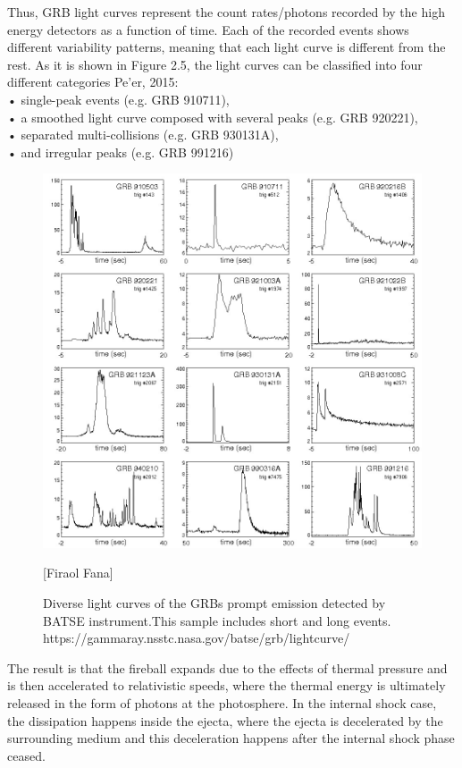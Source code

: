 Thus, GRB light curves represent the count rates/photons recorded by the
high energy detectors as a function of time. Each of the recorded events shows
different variability patterns, meaning that each light curve is different from the
rest. As it is shown in Figure 2.5, the light curves can be classified into four
different categories Pe’er, 2015:\\
• single-peak events (e.g. GRB 910711),\\
• a smoothed light curve composed with several peaks (e.g. GRB 920221),\\
• separated multi-collisions (e.g. GRB 930131A),\\
• and irregular peaks (e.g. GRB 991216)\\
\begin{figure}[h]
\begin{center}
\includegraphics[scale=0.4]{Figures/prompt.png}
\caption{Diverse light curves of the GRBs prompt emission detected by BATSE instrument.This sample includes short and long events. https://gammaray.nsstc.nasa.gov/batse/grb/lightcurve/}[Firaol Fana]
\end{center}
\end{figure}
The result is that the fireball expands due to the effects of thermal pressure and
is then accelerated to relativistic speeds, where the thermal energy is ultimately
released in the form of photons at the photosphere. In the internal shock case,
the dissipation happens inside the ejecta, where the ejecta is decelerated by the
surrounding medium and this deceleration happens after the internal shock phase
ceased. \citep{6}\citep{10}\citep{23}
